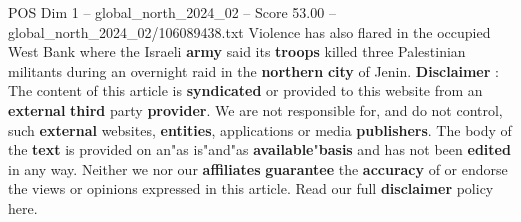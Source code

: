 \begin{textsample}{POS Dim 1 – global\_north\_2024\_02 – Score 53.00 – global\_north\_2024\_02/106089438.txt}
Violence has also flared in the occupied West Bank where the Israeli \textbf{army} said its \textbf{troops} killed three Palestinian militants during an overnight raid in the \textbf{northern} \textbf{city} of Jenin. \textbf{Disclaimer} : The content of this article is \textbf{syndicated} or provided to this website from an \textbf{external} \textbf{third} party \textbf{provider}.
We are not responsible for, and do not control, such \textbf{external} websites, \textbf{entities}, applications or media \textbf{publishers}.
The body of the \textbf{text} is provided on an"as is"and"as \textbf{available}"\textbf{basis} and has not been \textbf{edited} in any way.
Neither we nor our \textbf{affiliates} \textbf{guarantee} the \textbf{accuracy} of or endorse the views or opinions expressed in this article.
Read our full \textbf{disclaimer} policy here.

\end{textsample}
